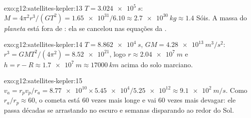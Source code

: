\begin{solution}{exo:g12:satellites-kepler:13}
$T = \qty{3.024e5}{s}$: $M = 4\pi^2 r^3/(GT^2) = \num{1.65e31}/6.10
\approx \qty{2.7e30}{kg} \approx 1.4$ Sóis. A massa do \emph{planeta}
está fora de : ela se cancelou nas equações da .
\end{solution}

\begin{solution}{exo:g12:satellites-kepler:14}
$T = \qty{8.862e4}{s}$, $GM = \qty{4.28e13}{m^3/s^2}$:
$r^3 = GMT^2/(4\pi^2) = \num{8.52e21}$, logo $r \approx \qty{2.04e7}{m}$
e $h = r - R \approx \qty{1.7e7}{m} \approx \qty{17000}{km}$ acima do
solo marciano.
\end{solution}

\begin{solution}{exo:g12:satellites-kepler:15}
$v_a = r_p v_p / r_a = \num{8.77e10} \times \num{5.45e4} /
\num{5.25e12} \approx \qty{9.1e2}{m/s}$. Como $r_a/r_p \approx 60$, o
cometa está $60$ vezes mais longe e vai $60$ vezes mais devagar: ele
passa décadas se arrastando no escuro e semanas disparando ao redor do
Sol.
\end{solution}

